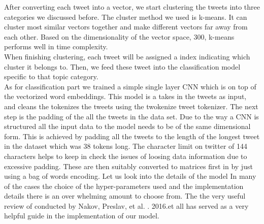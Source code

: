 \documentclass[conference]{IEEEtran}
\begin{document}
After converting each tweet into a vector, we start clustering the tweets into three categories we discussed before. The cluster method we used is k-means. It can cluster most similar vectors together and make different vectors far away from each other. Based on the dimensionality of the vector space, 300, k-means performs well in time complexity.
\\ \indent
When finishing clustering, each tweet will be assigned a index indicating which cluster it belongs to. Then, we feed these tweet into the classification model specific to that topic category.
\\ \indent
As for classification part we trained a simple single layer CNN which is on top of the vectorized word embeddings. This model is a takes in the tweets as input, and cleans the tokenizes the tweets using the twokenize tweet tokenizer. The next step is the padding of the all the tweets in the data set. Due to the way a CNN is structured all the input data to the model needs to be of the same dimensional form. This is achieved by padding all the tweets to the length of the longest tweet in the dataset which was 38 tokens long. The character limit on twitter of 144 characters helps to keep in check the issues of loosing data information due to excessive padding. These are then suitably converted to matrices first in by just using a bag of words encoding. Let us look into the details of the model In many of the cases the choice of the hyper-parameters used and the implementation details there is an over whelming amount to choose from. The the very useful review of conducted by Nakov, Preslav, et al. . 2016.et all has served as a very helpful guide in the implementation of our model.
\end{document}
